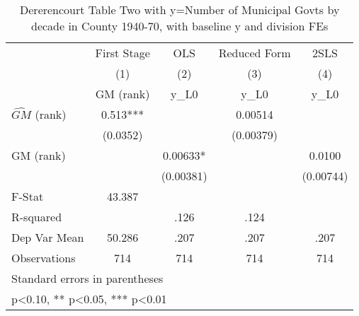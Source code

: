 \begin{table}[htbp]\centering
\def\sym#1{\ifmmode^{#1}\else\(^{#1}\)\fi}
\caption{Dererencourt Table Two with y=Number of Municipal Govts by decade in County 1940-70, with baseline y and division FEs}
\begin{tabular}{l*{4}{c}}
\toprule
                    & First Stage   &         OLS   &Reduced Form   &        2SLS   \\
                    &\multicolumn{1}{c}{(1)}&\multicolumn{1}{c}{(2)}&\multicolumn{1}{c}{(3)}&\multicolumn{1}{c}{(4)}\\
                    &\multicolumn{1}{c}{GM  (rank)}&\multicolumn{1}{c}{y\_L0}&\multicolumn{1}{c}{y\_L0}&\multicolumn{1}{c}{y\_L0}\\
\midrule
$\hat{GM}$ (rank)   &       0.513***&               &     0.00514   &               \\
                    &    (0.0352)   &               &   (0.00379)   &               \\
\addlinespace
GM  (rank)          &               &     0.00633*  &               &      0.0100   \\
                    &               &   (0.00381)   &               &   (0.00744)   \\
\midrule
F-Stat              &      43.387   &               &               &               \\
R-squared           &               &        .126   &        .124   &               \\
Dep Var Mean        &      50.286   &        .207   &        .207   &        .207   \\
Observations        &         714   &         714   &         714   &         714   \\
\bottomrule
\multicolumn{5}{l}{\footnotesize Standard errors in parentheses}\\
\multicolumn{5}{l}{\footnotesize * p<0.10, ** p<0.05, *** p<0.01}\\
\end{tabular}
\end{table}
